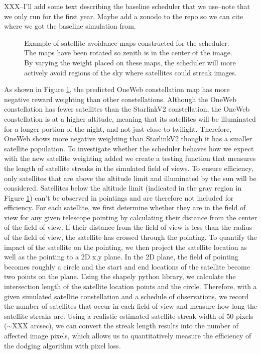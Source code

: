 \documentclass[linenumbers]{aastex631}
\begin{document}
XXX--I'll add some text describing the baseline scheduler that we use--note that we only run for the first year. Maybe add a zonodo to the repo so we can cite where we got the baseline simulation from.

\begin{figure}[ht!]
\caption{Example of satellite avoidance maps constructed for the scheduler. The maps have been rotated so zenith is in the center of the image. By varying the weight placed on these maps, the scheduler will more actively avoid regions of the sky where satellites could streak images. \label{fig-simulated-scheduler}}
\end{figure}

As shown in Figure \ref{fig-simulated-scheduler}, the predicted OneWeb constellation map has more negative reward weighting than other constellations. Although the OneWeb constellation has fewer satellites than the StarlinkV2 constellation, the OneWeb constellation is at a higher altitude, meaning that its satellites will be illuminated for a longer portion of the night, and not just close to twilight. Therefore, OneWeb shows more negative weighting than StarlinkV2 though it has a smaller satellite population. To investigate whether the scheduler behaves how we expect with the new satellite weighting added we create a testing function that measures the length of satellite streaks in the simulated field of views. To ensure efficiency, only satellites that are above the altitude limit and illuminated by the sun will be considered. Satellites below the altitude limit (indicated in the gray region in Figure \ref{fig-simulated-scheduler}) can’t be observed in pointings and are therefore not included for efficiency. For each satellite, we first determine whether they are in the field of view for any given telescope pointing by calculating their distance from the center of the field of view. If their distance from the field of view is less than the radius of the field of view, the satellite has crossed through the pointing. To quantify the impact of the satellite on the pointing, we then project the satellite location as well as the pointing to a 2D x,y plane. In the 2D plane, the field of pointing becomes roughly a circle and the start and end locations of the satellite become two points on the plane. Using the shapely python library, we calculate the intersection length of the satellite location points and the circle. Therefore, with a given simulated satellite constellation and a schedule of observations, we record the number of satellites that occur in each field of view and measure how long the satellite streaks are. Using a realistic estimated satellite streak width of 50 pixels ($\sim$XXX arcsec), we can convert the streak length results into the number of affected image pixels, which allows us to quantitatively measure the efficiency of the dodging algorithm with pixel loss. 
\end{document}
